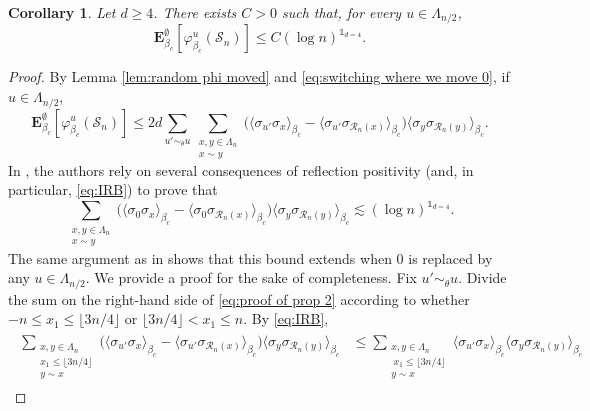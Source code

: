 \documentclass[11pt,a4paper]{article}
\numberwithin{equation}{section}
\theoremstyle{plain}
\newtheorem{Coro}[Thm]{Corollary}
\theoremstyle{definition}
\begin{document}
\begin{Coro}\label{coro:bound translate random s_n} Let $d\geq 4$. There exists $C>0$ such that, for every $u\in \Lambda_{n/2}$, 
\begin{equation}
	\mathbf E_{\beta_c}^\emptyset[\varphi_{\beta_c}^u(\mathcal S_n)]\leq C(\log n)^{\mathds{1}_{d=4}}.
\end{equation}
\end{Coro}
\begin{proof} By Lemma \ref{lem:random phi moved} and \eqref{eq:switching where we move 0}, if $u\in \Lambda_{n/2}$,
\begin{equation}\label{eq:proof of prop 2}
	\mathbf E_{\beta_c}^\emptyset[\varphi_{\beta_c}^u(\mathcal S_n)]\leq 2d\sum_{u'\sim_\theta u}\sum_{\substack{x,y\in \Lambda_n\\x\sim y}}\Big(\langle \sigma_{u'}\sigma_x\rangle_{\beta_c}-\langle \sigma_{u'}\sigma_{\mathcal R_n(x)}\rangle_{\beta_c}\Big)\langle \sigma_y\sigma_{\mathcal R_n(y)}\rangle_{\beta_c}.
	\end{equation}
In \cite[Theorem~1.3]{DuminilPanis2024newLB}, the authors rely on several consequences of reflection positivity (and, in particular, \eqref{eq:IRB}) to prove that
\begin{equation}\label{eq:proof of prop 3}
	\sum_{\substack{x,y\in \Lambda_n\\x\sim y}}\Big(\langle \sigma_{0}\sigma_x\rangle_{\beta_c}-\langle \sigma_{0}\sigma_{\mathcal R_n(x)}\rangle_{\beta_c}\Big)\langle \sigma_y\sigma_{\mathcal R_n(y)}\rangle_{\beta_c}\lesssim (\log n)^{\mathds{1}_{d=4}}.\end{equation}
		The same argument as in \cite{DuminilPanis2024newLB} shows that this bound extends when $0$ is replaced by any $u\in \Lambda_{n/2}$. We provide a proof for the sake of completeness. Fix $u'\sim_\theta u$. Divide the sum on the right-hand side of \eqref{eq:proof of prop 2} according to whether $-n\leq x_1\leq \lfloor 3n/4\rfloor $ or  $\lfloor 3n/4\rfloor  < x_1\leq n$.  By \eqref{eq:IRB}, 
\begin{align}\label{eq:proof of prop 3.3}
\begin{aligned}
    \sum_{\substack{x,y\in \Lambda_n\\x_1\leq \lfloor 3n/4\rfloor \\y\sim x}}\Big(\langle \sigma_{u'}\sigma_x\rangle_{\beta_c}-\langle \sigma_{u'}\sigma_{\mathcal{R}_n(x)}\rangle_{\beta_c}\Big)\langle \sigma_y \sigma_{\mathcal{R}_n(y)}\rangle_{\beta_c} &\leq\sum_{\substack{x,y\in \Lambda_n\\ \: x_1\leq \lfloor 3n/4\rfloor \\y\sim x}}\langle\sigma_{u'}\sigma_x\rangle_{\beta_c}\langle \sigma_y\sigma_{\mathcal{R}_n(y)}\rangle_{\beta_c}

\end{aligned}
\end{align}
\end{proof}
\end{document}
